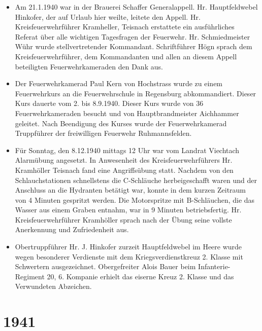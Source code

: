 \documentclass[12pt,a4paper]{book}
\begin{document}
\begin{itemize}
\item Am 21.1.1940 war in der Brauerei Schaffer Generalappell. Hr.
Hauptfeldwebel Hinkofer, der auf Urlaub hier weilte, leitete den Appell. Hr.
Kreisfeuerwehrführer Kramheller, Teisnach erstattete ein ausführliches Referat
über alle wichtigen Tagesfragen der Feuerwehr. Hr. Schmiedmeister Wühr wurde
stellvertretender Kommandant. Schriftführer Högn sprach dem
Kreisfeuerwehrführer, dem Kommandanten und allen an diesem Appell beteiligten
Feuerwehrkameraden den Dank aus.

\item Der Feuerwehrkamerad Paul Kern von Hochstrass wurde zu einem Feuerwehrkurs
an die Feuerwehrschule in Regensburg abkommandiert. Dieser Kurs dauerte vom 2.
bis 8.9.1940. Dieser Kurs wurde von 36 Feuerwehrkameraden besucht und von
Hauptbrandmeister Aichhammer geleitet. Nach Beendigung des Kurses wurde der
Feuerwehrkamerad Truppführer der freiwilligen Feuerwehr Ruhmannsfelden.

\item Für Sonntag, den 8.12.1940 mittags 12 Uhr war vom Landrat Viechtach
Alarmübung angesetzt. In Anwesenheit des Kreisfeuerwehrführers Hr. Kramhöller
Teisnach fand eine Angriffsübung statt. Nachdem von den Schlauchstationen
schnellstens die C-Schläuche herbeigeschafft waren und der Anschluss an die
Hydranten betätigt war, konnte in dem kurzen Zeitraum von 4 Minuten gespritzt
werden. Die Motorspritze mit B-Schläuchen, die das Wasser aus einem Graben
entnahm, war in 9 Minuten betriebsfertig. Hr. Kreisfeuerwehrführer Kramhöller
sprach nach der Übung seine vollste Anerkennung und Zufriedenheit aus.

\item Obertruppführer Hr. J. Hinkofer zurzeit Hauptfeldwebel im Heere wurde
wegen besonderer Verdienste mit dem Kriegsverdienstkreuz 2. Klasse mit
Schwertern ausgezeichnet. Obergefreiter Alois Bauer beim Infanterie-Regiment 20,
6. Kompanie erhielt das eiserne Kreuz 2. Klasse und das Verwundeten Abzeichen.
\end{itemize}

\section*{1941}
\end{document}
